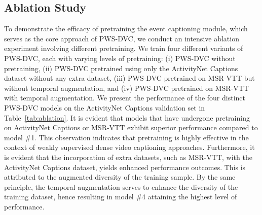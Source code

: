 \subsection{Ablation Study}
To demonstrate the efficacy of pretraining the event captioning module, which serves as the core approach of PWS-DVC, we conduct an intensive ablation experiment involving different pretraining.
We train four different variants of PWS-DVC, each with varying levels of pretraining: (i) PWS-DVC without pretraining, (ii) PWS-DVC pretrained using only the ActivityNet Captions dataset without any extra dataset, (iii) PWS-DVC pretrained on MSR-VTT but without temporal augmentation, and (iv) PWS-DVC pretrained on MSR-VTT with temporal augmentation.
We present the performance of the four distinct PWS-DVC models on the ActivityNet Captions validation set in Table~\ref{tab:ablation}.
It is evident that models that have undergone pretraining on ActivityNet Captions or MSR-VTT exhibit superior performance compared to model \#1.
This observation indicates that pretraining is highly effective in the context of weakly supervised dense video captioning approaches.
Furthermore, it is evident that the incorporation of extra datasets, such as MSR-VTT, with the ActivityNet Captions dataset, yields enhanced performance outcomes.
This is attributed to the augmented diversity of the training sample.
By the same principle, the temporal augmentation serves to enhance the diversity of the training dataset, hence resulting in model \#4 attaining the highest level of performance.
